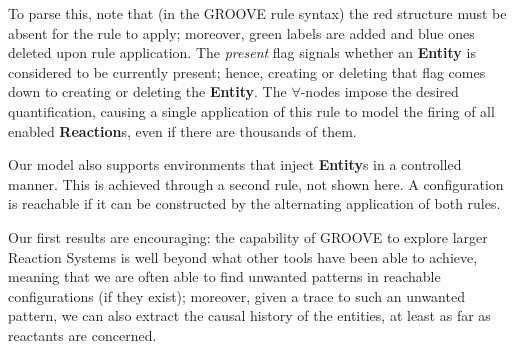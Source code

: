 \documentclass{llncs}
\newcommand{\lab}[1]{\textsf{#1}}
\newcommand{\blab}[1]{\lab{\bfseries #1}}
\newcommand{\ilab}[1]{\lab{\itshape #1}}
\begin{document}
To parse this, note that (in the GROOVE rule syntax) the red structure must be absent for the rule to apply; moreover, green labels are added and blue ones deleted upon rule application. The \ilab{present} flag signals whether an \blab{Entity} is considered to be currently present; hence, creating or deleting that flag comes down to creating or deleting the \blab{Entity}. The $\forall$-nodes impose the desired quantification, causing a single application of this rule to model the firing of all enabled \blab{Reaction}s, even if there are thousands of them.

Our model also supports environments that inject \blab{Entity}s in a controlled manner. This is achieved through a second rule, not shown here. A configuration is reachable if it can be constructed by the alternating application of both rules.

\medskip\noindent
Our first results are encouraging: the capability of GROOVE to explore larger Reaction Systems is well beyond what other tools have been able to achieve, meaning that we are often able to find unwanted patterns in reachable configurations (if they exist); moreover, given a trace to such an unwanted pattern, we can also extract the causal history of the entities, at least as far as reactants are concerned.

%
%


%
\end{document}

